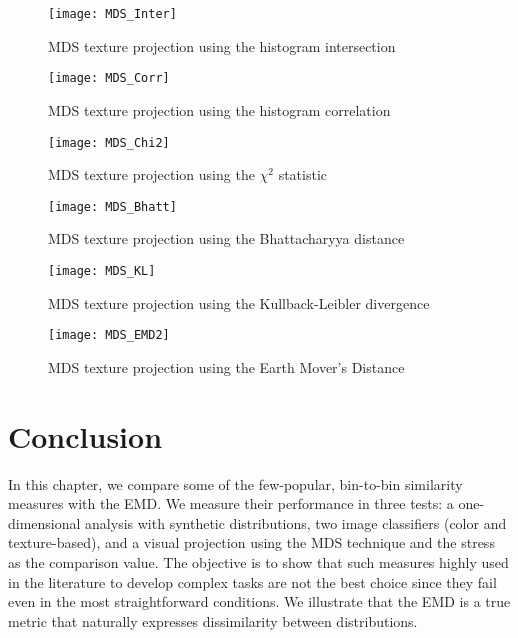 \begin{figure}[!ht]
 \centering    
 \texttt{[image: MDS\_Inter]}
 \caption{MDS texture projection using the histogram intersection}
 \label{fig:MDS_Inter} 
\end{figure}

\begin{figure}[!ht]
 \centering    
 \texttt{[image: MDS\_Corr]}
 \caption{MDS texture projection using the histogram correlation}
 \label{fig:MDS_Corr} 
\end{figure}

\begin{figure}[!ht]
 \centering    
 \texttt{[image: MDS\_Chi2]}
 \caption{MDS texture projection using the $\chi^2$ statistic}
 \label{fig:MDS_Chi2} 
\end{figure}

\begin{figure}[!ht]
 \centering    
 \texttt{[image: MDS\_Bhatt]}
 \caption{MDS texture projection using the Bhattacharyya distance}
 \label{fig:MDS_Bhatt} 
\end{figure}

\begin{figure}[!ht]
 \centering    
 \texttt{[image: MDS\_KL]}
 \caption{MDS texture projection using the Kullback-Leibler divergence}
 \label{fig:MDS_KL} 
\end{figure}

\begin{figure}[!ht]
 \centering    
 \texttt{[image: MDS\_EMD2]}
 \caption{MDS texture projection using the Earth Mover's Distance}
 \label{fig:MDS_EMD} 
\end{figure}

\section{Conclusion}\label{sec:conclusions}

In this chapter, we compare some of the few-popular, bin-to-bin similarity measures with the EMD. We measure their performance in three tests: a one-dimensional analysis with synthetic distributions, two image classifiers (color and texture-based), and a visual projection using the MDS technique and the stress as the comparison value. The objective is to show that such measures highly used in the literature to develop complex tasks are not the best choice since they fail even in the most straightforward conditions. We illustrate that the EMD is a true metric \citep{Peyre.Cuturi:arXiv:2018} that naturally expresses dissimilarity between distributions.

